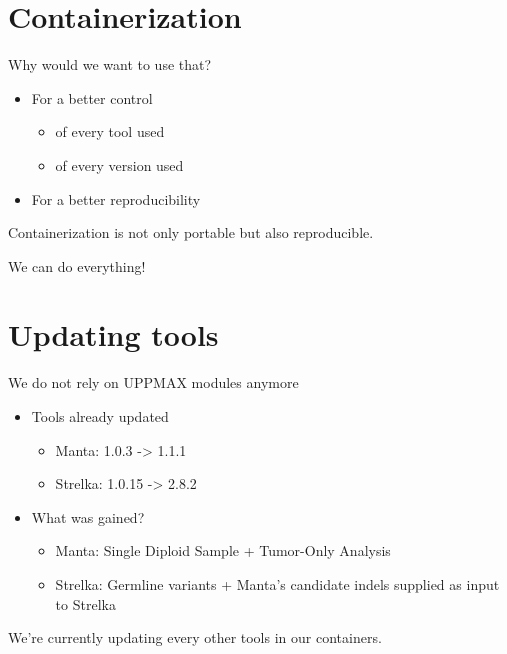 \documentclass{beamer}
\begin{document}
\section{Containerization}

\begin{frame}{Why would we want to use that?}
	\begin{itemize}
		\item For a better control
		\pause
		\begin{itemize}
			\item of every tool used
			\item of every version used
		\end{itemize}
		\pause
		\item For a better reproducibility
		\pause
	\end{itemize}
	Containerization is not only portable but also reproducible.
\end{frame}

\begin{frame}{We can do everything!}
\end{frame}

\section{Updating tools}

\begin{frame}{We do not rely on UPPMAX modules anymore}
	\begin{itemize}
		\item Tools already updated
		\pause
		\begin{itemize}
			\item Manta: 1.0.3 -> 1.1.1
			\item Strelka: 1.0.15 -> 2.8.2
		\end{itemize}
		\pause
		\item What was gained?
		\pause
		\begin{itemize}
			\item Manta: Single Diploid Sample + Tumor-Only Analysis
			\item Strelka: Germline variants + Manta's candidate indels supplied as input to Strelka
		\end{itemize}
	\end{itemize}
	We're currently updating every other tools in our containers.
\end{frame}
\end{document}
